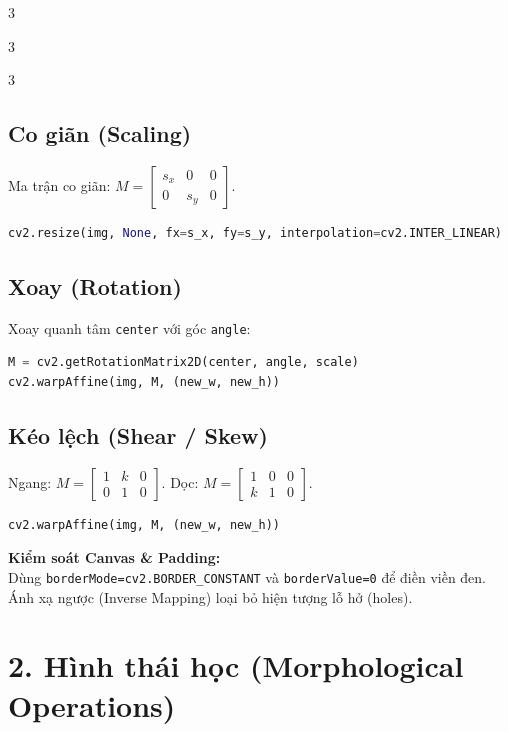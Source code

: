 \documentclass[9pt,landscape,a4paper]{extarticle}
\begin{document}
\begin{multicols*}{3}
\begin{multicols*}{3}
\begin{multicols}{3}
\subsection*{Co giãn (Scaling)}
Ma trận co giãn: $M = \begin{bmatrix} s_x & 0 & 0 \\ 0 & s_y & 0 \end{bmatrix}$.\\
\begin{lstlisting}[language=Python]
cv2.resize(img, None, fx=s_x, fy=s_y, interpolation=cv2.INTER_LINEAR)
\end{lstlisting}

\subsection*{Xoay (Rotation)}
Xoay quanh tâm \texttt{center} với góc \texttt{angle}:
\begin{lstlisting}[language=Python]
M = cv2.getRotationMatrix2D(center, angle, scale)
cv2.warpAffine(img, M, (new_w, new_h))
\end{lstlisting}

\subsection*{Kéo lệch (Shear / Skew)}
Ngang: $M = \begin{bmatrix} 1 & k & 0 \\ 0 & 1 & 0 \end{bmatrix}$. Dọc: $M = \begin{bmatrix} 1 & 0 & 0 \\ k & 1 & 0 \end{bmatrix}$.
\begin{lstlisting}[language=Python]
cv2.warpAffine(img, M, (new_w, new_h))
\end{lstlisting}

\begin{tipbox}
\textbf{Kiểm soát Canvas \& Padding:}\\
Dùng \texttt{borderMode=cv2.BORDER\_CONSTANT} và \texttt{borderValue=0} để điền viền đen. Ánh xạ ngược (Inverse Mapping) loại bỏ hiện tượng lỗ hở (holes).
\end{tipbox}

\section{2. Hình thái học (Morphological Operations)}


\end{multicols}
\end{multicols*}
\end{multicols*}
\end{document}
